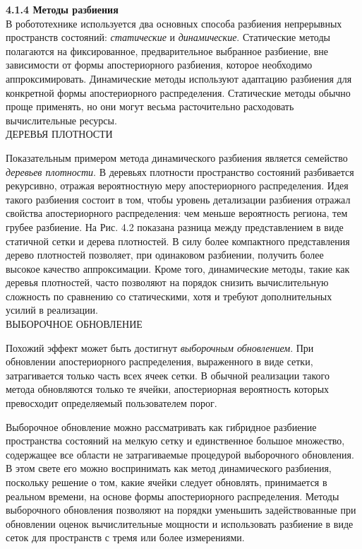 \documentclass[10pt,a4paper]{article}
\begin{document}
\textbf{4.1.4 Методы разбиения}\\

В робототехнике используется два основных способа разбиения непрерывных пространств состояний: \textit{статические} и \textit{динамические}. Статические методы полагаются на фиксированное, предварительное выбранное разбиение, вне зависимости от формы апостериорного разбиения, которое необходимо аппроксимировать. Динамические методы используют адаптацию разбиения для конкретной формы апостериорного распределения. Статические методы обычно проще применять, но они могут весьма расточительно расходовать вычислительные ресурсы.\\
ДЕРЕВЬЯ ПЛОТНОСТИ

Показательным примером метода динамического разбиения является семейство \textit{деревьев плотности}. В деревьях плотности пространство состояний разбивается рекурсивно, отражая вероятностную меру апостериорного распределения. Идея такого разбиения состоит в том, чтобы уровень детализации разбиения отражал свойства апостериорного распределения: чем меньше вероятность региона, тем грубее разбиение. На Рис. 4.2 показана разница между представлением в виде статичной сетки и дерева плотностей. В силу более компактного представления дерево плотностей позволяет, при одинаковом разбиении, получить более высокое качество аппроксимации. Кроме того, динамические методы, такие как деревья плотностей, часто позволяют на порядок снизить вычислительную сложность по сравнению со статическими, хотя и требуют дополнительных усилий в реализации.\\
ВЫБОРОЧНОЕ ОБНОВЛЕНИЕ

Похожий эффект  может быть достигнут  
\textit{выборочным обновлением}. При обновлении апостериорного распределения, выраженного в виде сетки, затрагивается только часть всех ячеек сетки. В обычной реализации такого метода обновляются только те ячейки, апостериорная вероятность которых превосходит определяемый пользователем порог.

Выборочное обновление можно рассматривать как гибридное разбиение пространства состояний на мелкую сетку и единственное большое множество, содержащее все области не затрагиваемые процедурой выборочного обновления. В этом свете его можно воспринимать как метод динамического разбиения, поскольку решение о том, какие ячейки следует обновлять, принимается в реальном времени, на основе формы апостериорного распределения. Методы выборочного обновления позволяют на порядки уменьшить задействованные при обновлении оценок вычислительные мощности  и использовать разбиение в виде сеток для пространств с тремя или более измерениями.  
 
\end{document}
